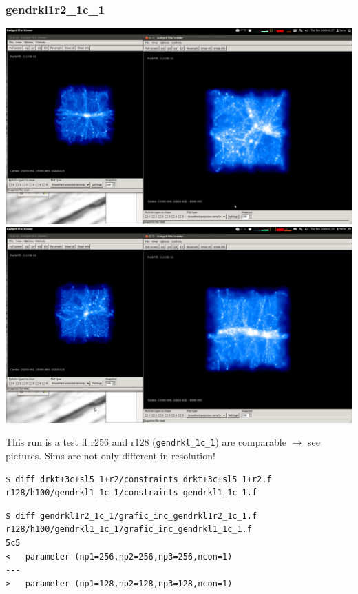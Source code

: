 \documentclass[a4paper,11pt,fleqn,oneside]{book}
\begin{document}
\newpage
\subsubsection{gendrkl1r2\_1c\_1}

\includegraphics[scale=0.2]{gendrkl1r2_1c_1/1.png} \\
\includegraphics[scale=0.2]{gendrkl1r2_1c_1/2.png} 

This run is a test if r256 and r128 (\texttt{gendrkl\_1c\_1}) are comparable $\rightarrow$ see pictures. Sims are not only different in resolution! 

\begin{verbatim}
$ diff drkt+3c+sl5_1+r2/constraints_drkt+3c+sl5_1+r2.f 
r128/h100/gendrkl1_1c_1/constraints_gendrkl1_1c_1.f 
\end{verbatim}
\begin{verbatim}
$ diff gendrkl1r2_1c_1/grafic_inc_gendrkl1r2_1c_1.f  
r128/h100/gendrkl1_1c_1/grafic_inc_gendrkl1_1c_1.f 
5c5
< 	parameter (np1=256,np2=256,np3=256,ncon=1)
---
> 	parameter (np1=128,np2=128,np3=128,ncon=1)
\end{verbatim}
\end{document}
